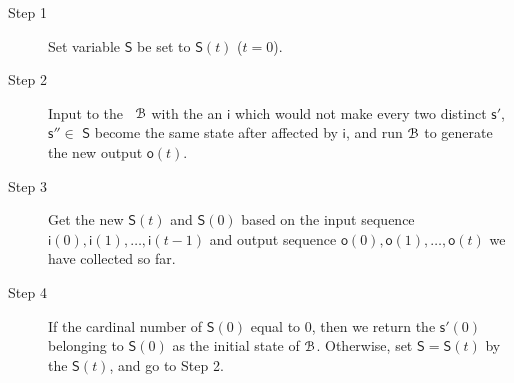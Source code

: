 

 
\begin{description}
	\item[Step 1]  Set variable $\mathsf{S}$ be set to $\mathsf{S}(t)$ ($t=0$).
	\item[Step 2] Input to the \BCN\ ${\mathcal{B}}$ with the an $\mathsf{i}$ which would not make every two distinct $\mathsf{s}'$, $\mathsf{s}''$$\in$ $\mathsf{S}$ become the same state after affected by $\mathsf{i}$, and run ${\mathcal{B}}$ to generate the new output $\mathsf{o}(t)$.
	\item[Step 3] Get the new $\mathsf{S}(t)$ and $\mathsf{S}(0)$ based on the input sequence $\mathsf{i}(0),\mathsf{i}(1),\ldots, \mathsf{i}(t-1)$ and output sequence $\mathsf{o}(0),\mathsf{o}(1),\ldots,\mathsf{o}(t)$ we have collected so far.
	\item[Step 4] If the cardinal number of $\mathsf{S}(0)$ equal to $0$, then we return the $\mathsf{s}'(0)$ belonging to $\mathsf{S}(0)$ as the initial state of ${\mathcal{B}}$. Otherwise, set $\mathsf{S}=\mathsf{S}(t)$ by the $\mathsf{S}(t)$, and go to Step 2.
\end{description}

